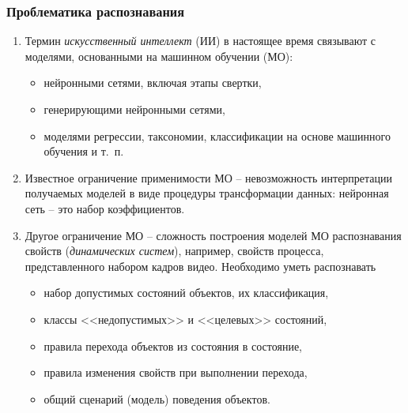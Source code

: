 \documentclass[10pt]{beamer}
\begin{document}
\begin{frame}
  \frametitle{Проблематика распознавания}
  \begin{enumerate}
  \item Термин \emph{искусственный интеллект} (ИИ) в настоящее время связывают с моделями, основанными на машинном обучении (МО):
    \begin{itemize}
    \item нейронными сетями, включая этапы свертки,
    \item генерирующими нейронными сетями,
    \item моделями регрессии, таксономии, классификации на основе машинного обучения и т.~п.
    \end{itemize}
  \item Известное ограничение применимости МО -- невозможность интерпретации получаемых моделей в виде процедуры трансформации данных: нейронная сеть -- это набор коэффициентов.
  \item Другое ограничение МО -- сложность построения моделей МО распознавания свойств (\emph{динамических систем}), например, свойств процесса, представленного набором кадров видео. Необходимо уметь распознавать
    \begin{itemize}
    \item набор допустимых состояний объектов, их классификация,
    \item классы <<недопустимых>> и <<целевых>> состояний,
    \item правила перехода объектов из состояния в состояние,
    \item правила изменения свойств при выполнении перехода,
    \item общий сценарий (модель) поведения объектов.
    \end{itemize}
  \end{enumerate}
\end{frame}
\end{document}
